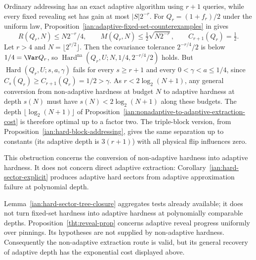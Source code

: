 \begin{remark}
\label{ian:nonadaptive-extraction-adaptivity-obstruction}
Ordinary addressing has an exact adaptive algorithm using \(r+1\)
queries, while every fixed revealing set has gain at most
\(|S|2^{-r}\). For \(Q_r=(1+f_r)/2\) under the uniform law,
Proposition~\ref{ian:adaptive-fixed-set-counterexamples} in
 gives
\[
 R(Q_r,N)\le N2^{-r}/4,\qquad
 M(Q_r,N)\le\tfrac12\sqrt{N2^{-r}},\qquad
 C_{r+1}(Q_r)=\tfrac12.
\]
Let \(r>4\) and \(N=\lfloor2^{r/2}\rfloor\). Then the covariance
tolerance \(2^{-r/4}/2\) is below \(1/4=\Var Q_r\), so
\(\operatorname{Hard}^{\mathrm{na}}(Q_r,U;N,1/4,2^{-r/4}/2)\) holds.
But \(\operatorname{Hard}(Q_r,U;s,a,\gamma)\) fails for every
\(s\ge r+1\) and every \(0<\gamma<a\le1/4\), since
\(C_s(Q_r)\ge C_{r+1}(Q_r)=1/2>\gamma\). As \(r<2\log_2(N+1)\), any
general conversion from non-adaptive hardness at budget \(N\) to
adaptive hardness at depth \(s(N)\) must have \(s(N)<2\log_2(N+1)\) along
these budgets. The depth \(\lfloor\log_2(N+1)\rfloor\) of
Proposition~\ref{ian:nonadaptive-to-adaptive-extraction-cost} is
therefore optimal up to a factor two. The triple-block version,
from Proposition~\ref{ian:hard-block-addressing}, gives the same
separation up to constants (its adaptive depth is \(3(r+1)\)) with all
physical flip influences zero.

This obstruction concerns the conversion of non-adaptive hardness
into adaptive hardness. It does not concern direct adaptive
extraction: Corollary~\ref{ian:hard-sector-explicit} produces adaptive
hard sectors from adaptive approximation failure at polynomial depth.

Lemma~\ref{ian:hard-sector-tree-closure} aggregates tests already
available; it does not turn fixed-set hardness into adaptive
hardness at polynomially comparable depths.
Proposition~\ref{tht:reveal-prop} concerns adaptive reveal progress
uniformly over pinnings. Its hypotheses are not supplied by
non-adaptive hardness. Consequently the non-adaptive extraction route
is valid, but its general recovery of adaptive depth has the
exponential cost displayed above.
\end{remark}
